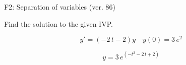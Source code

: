 \begin{exercise}
  \begin{exerciseTitle}F2: Separation of variables (ver. 86)\end{exerciseTitle}
  \begin{exerciseStatement}
    
Find the solution to the given IVP.

    
\[y'=( -2 \, t - 2 )y\hspace{1em} y(0)= 3 \, e^{2}\]

  \end{exerciseStatement}
  \begin{exerciseAnswer}
    
\[y= 3 \, e^{\left(-t^{2} - 2 \, t + 2\right)}\]

  \end{exerciseAnswer}
\end{exercise}